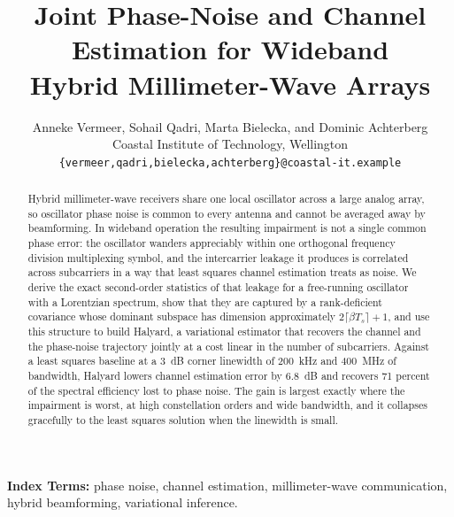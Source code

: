 \documentclass[10pt,twocolumn]{article}
\title{\vspace{-6mm}\bfseries\large
Joint Phase-Noise and Channel Estimation for Wideband\\
Hybrid Millimeter-Wave Arrays}
\author{
  \normalsize Anneke Vermeer, Sohail Qadri, Marta Bielecka, and Dominic Achterberg\\[1mm]
  \footnotesize Coastal Institute of Technology, Wellington\\
  \footnotesize \texttt{\{vermeer,qadri,bielecka,achterberg\}@coastal-it.example}
}
\date{}
\newcommand{\est}{Halyard}
\begin{document}
\maketitle

\begin{abstract}
\noindent
\footnotesize
Hybrid millimeter-wave receivers share one local oscillator across a large
analog array, so oscillator phase noise is common to every antenna and cannot
be averaged away by beamforming. In wideband operation the resulting impairment
is not a single common phase error: the oscillator wanders appreciably within
one orthogonal frequency division multiplexing symbol, and the intercarrier
leakage it produces is correlated across subcarriers in a way that least
squares channel estimation treats as noise. We derive the exact second-order
statistics of that leakage for a free-running oscillator with a Lorentzian
spectrum, show that they are captured by a rank-deficient covariance whose
dominant subspace has dimension approximately $2\lceil \beta T_s \rceil + 1$,
and use this structure to build \est, a variational estimator that recovers the
channel and the phase-noise trajectory jointly at a cost linear in the number
of subcarriers. Against a least squares baseline at a 3~dB corner linewidth of
200~kHz and 400~MHz of bandwidth, \est{} lowers channel estimation error by
6.8~dB and recovers 71 percent of the spectral efficiency lost to phase noise.
The gain is largest exactly where the impairment is worst, at high
constellation orders and wide bandwidth, and it collapses gracefully to the
least squares solution when the linewidth is small.
\end{abstract}

\vspace{2mm}
{\footnotesize \noindent \textbf{Index Terms:} phase noise, channel estimation,
millimeter-wave communication, hybrid beamforming, variational inference.}

\vspace{3mm}










\end{document}
